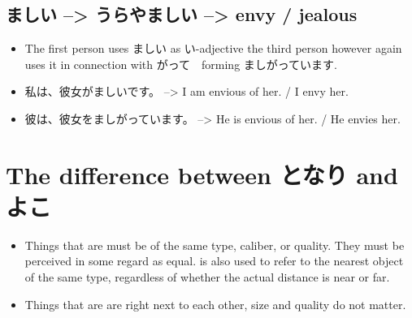 \documentclass{article}
\newcommand\tabi[1][0.05cm]{\hspace*{#1}}
\begin{document}
\subsection{ましい --> うらやましい --> envy / jealous }
\begin{itemize}
\item The first person uses ましい as い-adjective the third person however again uses it in connection with がって　forming ましがっています.
\item 私は、彼女がましいです。 --> I am envious of her. / I envy her.
\item 彼は、彼女をましがっています。 --> He is envious of her. / He envies her.
\end{itemize}
\section{The difference between となり and よこ}
\begin{itemize}
\item Things that are  \tabi must be of the same type, caliber, or quality. They must be perceived in some regard as equal.  \tabi is also used to refer to the nearest object of the same type, regardless of whether the actual distance is near or far.
\item Things that are  \tabi are right next to each other, size and quality do not matter.
\end{itemize}
\end{document}
